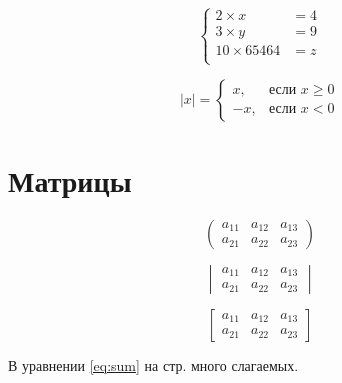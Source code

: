 \documentclass[a4paper,12pt]{article} %
\begin{document}
\begin{equation}
\left\{
\begin{aligned}
2\times x &= 4  \\
3\times y &= 9\\
10 \times 65464 &= z\\
\end{aligned}
\right.
\end{equation}


\[
	|x|=\begin{cases}
		x, &\text{если }  x \ge 0 \\
		-x, &\text{если } x<0
	\end{cases}
\]

\section{Матрицы}

\[
	\begin{pmatrix}
		a_{11} & a_{12} & a_{13} \\
		a_{21} & a_{22} & a_{23}
	\end{pmatrix}
\]

\[
	\begin{vmatrix}
		a_{11} & a_{12} & a_{13} \\
		a_{21} & a_{22} & a_{23}
	\end{vmatrix}
\]

\[
	\begin{bmatrix}
		a_{11} & a_{12} & a_{13} \\
		a_{21} & a_{22} & a_{23}
	\end{bmatrix}
\]

В уравнении \eqref{eq:sum} на стр. \pageref{eq:sum} много слагаемых.
\end{document}

